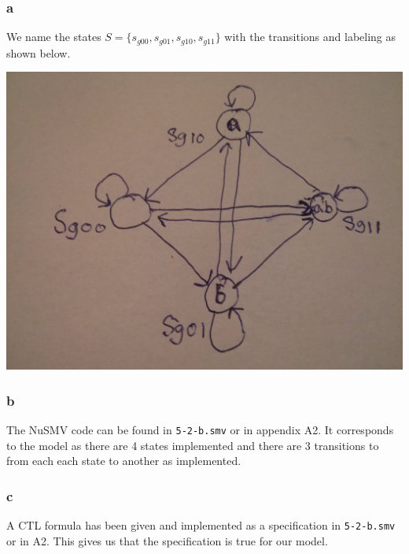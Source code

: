 \documentclass[12pt]{article}
\begin{document}
\subsubsection*{a}
We name the states $S=\{s_{g00},s_{g01},s_{g10},s_{g11}\}$ with the transitions and labeling as shown below.
\begin{center}
\includegraphics[scale=0.1]{5}
\end{center}

\subsubsection*{b}
The NuSMV code can be found in \texttt{5-2-b.smv} or in appendix A2. It corresponds to the model as there are 4 states implemented and there are 3 transitions to from each each state to another as implemented.

\subsubsection*{c}
A CTL formula has been given and implemented as a specification in \texttt{5-2-b.smv} or in A2. This gives us that the specification is true for our model.
\end{document}
